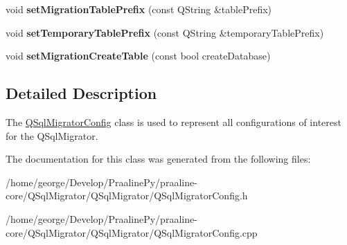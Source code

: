 \begin{DoxyCompactItemize}
void {\bfseries set\+Migration\+Table\+Prefix} (const Q\+String \&table\+Prefix)
\item 
\mbox{\label{class_q_sql_migrator_1_1_q_sql_migrator_config_a3a23088d431ae2968ab3d07ead11711a}} 
void {\bfseries set\+Temporary\+Table\+Prefix} (const Q\+String \&temporary\+Table\+Prefix)
\item 
\mbox{\label{class_q_sql_migrator_1_1_q_sql_migrator_config_a07a217f85682378cc33b6afe0a1e72e1}} 
void {\bfseries set\+Migration\+Create\+Table} (const bool create\+Database)
\end{DoxyCompactItemize}


\subsection{Detailed Description}
The \hyperlink{class_q_sql_migrator_1_1_q_sql_migrator_config}{Q\+Sql\+Migrator\+Config} class is used to represent all configurations of interest for the Q\+Sql\+Migrator. 

The documentation for this class was generated from the following files\+:\begin{DoxyCompactItemize}
\item 
/home/george/\+Develop/\+Praaline\+Py/praaline-\/core/\+Q\+Sql\+Migrator/\+Q\+Sql\+Migrator/Q\+Sql\+Migrator\+Config.\+h\item 
/home/george/\+Develop/\+Praaline\+Py/praaline-\/core/\+Q\+Sql\+Migrator/\+Q\+Sql\+Migrator/Q\+Sql\+Migrator\+Config.\+cpp\end{DoxyCompactItemize}
